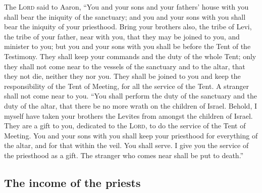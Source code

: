  The \textsc{Lord} said to Aaron, ``You and your sons and
your fathers' house with you shall bear the iniquity of the sanctuary;
and you and your sons with you shall bear the iniquity of your
priesthood.  Bring your brothers also, the tribe of Levi,
the tribe of your father, near with you, that they may be joined to you,
and minister to you; but you and your sons with you shall be before the
Tent of the Testimony.  They shall keep your commands and
the duty of the whole Tent; only they shall not come near to the vessels
of the sanctuary and to the altar, that they not die, neither they nor
you.  They shall be joined to you and keep the
responsibility of the Tent of Meeting, for all the service of the Tent.
A stranger shall not come near to you.  ``You shall
perform the duty of the sanctuary and the duty of the altar, that there
be no more wrath on the children of Israel.  Behold, I
myself have taken your brothers the Levites from amongst the children of
Israel. They are a gift to you, dedicated to the \textsc{Lord}, to do
the service of the Tent of Meeting.  You and your sons
with you shall keep your priesthood for everything of the altar, and for
that within the veil. You shall serve. I give you the service of the
priesthood as a gift. The stranger who comes near shall be put to
death.''

\hypertarget{the-income-of-the-priests}{%
\subsection{The income of the priests}\label{the-income-of-the-priests}}

